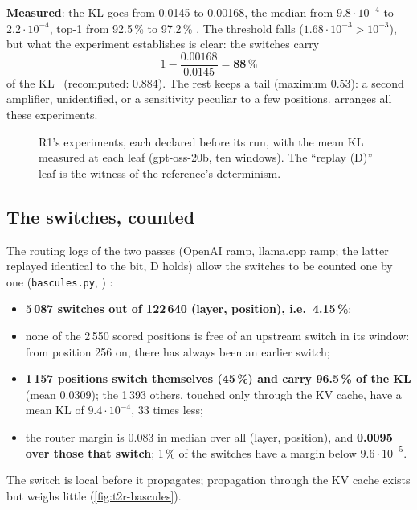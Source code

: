 \textbf{Measured}: the KL goes from 0.0145 to 0.00168, the median from $9.8\cdot10^{-4}$ to $2.2\cdot10^{-4}$, top-1 from 92.5\,\% to 97.2\,\% \mes. The threshold falls ($1.68\cdot10^{-3} > 10^{-3}$), but what the experiment establishes is clear: the switches carry
\[
1 - \frac{0.00168}{0.0145} = \mathbf{88\,\%}
\]
of the KL \calc~(recomputed: 0.884). The rest keeps a tail (maximum 0.53): a second amplifier, unidentified, or a sensitivity peculiar to a few positions.  arranges all these experiments.

\begin{figure}[ht]
\centering
\SchemaRefArbre
\caption[The tree of R1's experiments]{R1's experiments, each declared before its run, with the mean KL measured at each leaf (gpt-oss-20b, ten windows). The \enquote{replay (D)} leaf is the witness of the reference's determinism.}
\label{fig:t2r-arbre}
\end{figure}

\subsection{The switches, counted}\label{sec:t2r-comptees}

The routing logs of the two passes (OpenAI ramp, llama.cpp ramp; the latter replayed identical to the bit, D holds) allow the switches to be counted one by one (\texttt{bascules.py}, ) \mes:
\begin{itemize}
\item \textbf{5\,087 switches out of 122\,640 (layer, position), i.e.\ 4.15\,\%};
\item none of the 2\,550 scored positions is free of an upstream switch in its window: from position 256 on, there has always been an earlier switch;
\item \textbf{1\,157 positions switch themselves (45\,\%) and carry 96.5\,\% of the KL} (mean 0.0309); the 1\,393 others, touched only through the KV cache, have a mean KL of $9.4\cdot10^{-4}$, 33 times less;
\item the router margin is 0.083 in median over all (layer, position), and \textbf{0.0095 over those that switch}; 1\,\% of the switches have a margin below $9.6\cdot10^{-5}$.
\end{itemize}
The switch is local before it propagates; propagation through the KV cache exists but weighs little (\cref{fig:t2r-bascules}).

